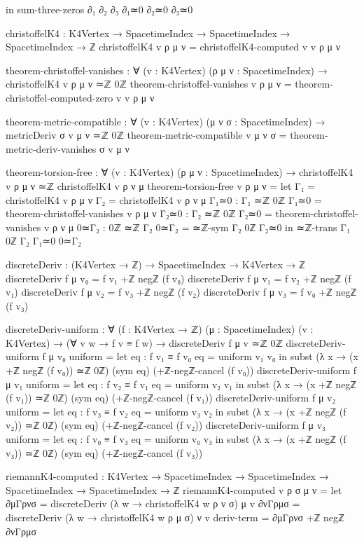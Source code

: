 \documentclass[11pt,a4paper]{book}
\begin{document}
\begin{code}
  in sum-three-zeros ∂₁ ∂₂ ∂₃ ∂₁≃0 ∂₂≃0 ∂₃≃0

christoffelK4 : K4Vertex → SpacetimeIndex → SpacetimeIndex → SpacetimeIndex → ℤ
christoffelK4 v ρ μ ν = christoffelK4-computed v v ρ μ ν

theorem-christoffel-vanishes : ∀ (v : K4Vertex) (ρ μ ν : SpacetimeIndex) →
                                christoffelK4 v ρ μ ν ≃ℤ 0ℤ
theorem-christoffel-vanishes v ρ μ ν = theorem-christoffel-computed-zero v v ρ μ ν

theorem-metric-compatible : ∀ (v : K4Vertex) (μ ν σ : SpacetimeIndex) →
  metricDeriv σ v μ ν ≃ℤ 0ℤ
theorem-metric-compatible v μ ν σ = theorem-metric-deriv-vanishes σ v μ ν

theorem-torsion-free : ∀ (v : K4Vertex) (ρ μ ν : SpacetimeIndex) →
  christoffelK4 v ρ μ ν ≃ℤ christoffelK4 v ρ ν μ
theorem-torsion-free v ρ μ ν = 
  let Γ₁ = christoffelK4 v ρ μ ν
      Γ₂ = christoffelK4 v ρ ν μ
      Γ₁≃0 : Γ₁ ≃ℤ 0ℤ
      Γ₁≃0 = theorem-christoffel-vanishes v ρ μ ν
      Γ₂≃0 : Γ₂ ≃ℤ 0ℤ
      Γ₂≃0 = theorem-christoffel-vanishes v ρ ν μ
      0≃Γ₂ : 0ℤ ≃ℤ Γ₂
      0≃Γ₂ = ≃ℤ-sym {Γ₂} {0ℤ} Γ₂≃0
  in ≃ℤ-trans {Γ₁} {0ℤ} {Γ₂} Γ₁≃0 0≃Γ₂

discreteDeriv : (K4Vertex → ℤ) → SpacetimeIndex → K4Vertex → ℤ
discreteDeriv f μ v₀ = f v₁ +ℤ negℤ (f v₀)
discreteDeriv f μ v₁ = f v₂ +ℤ negℤ (f v₁)
discreteDeriv f μ v₂ = f v₃ +ℤ negℤ (f v₂)
discreteDeriv f μ v₃ = f v₀ +ℤ negℤ (f v₃)

discreteDeriv-uniform : ∀ (f : K4Vertex → ℤ) (μ : SpacetimeIndex) (v : K4Vertex) →
                        (∀ v w → f v ≡ f w) → discreteDeriv f μ v ≃ℤ 0ℤ
discreteDeriv-uniform f μ v₀ uniform = 
  let eq : f v₁ ≡ f v₀
      eq = uniform v₁ v₀
  in subst (λ x → (x +ℤ negℤ (f v₀)) ≃ℤ 0ℤ) (sym eq) (+ℤ-negℤ-cancel (f v₀))
discreteDeriv-uniform f μ v₁ uniform = 
  let eq : f v₂ ≡ f v₁
      eq = uniform v₂ v₁
  in subst (λ x → (x +ℤ negℤ (f v₁)) ≃ℤ 0ℤ) (sym eq) (+ℤ-negℤ-cancel (f v₁))
discreteDeriv-uniform f μ v₂ uniform = 
  let eq : f v₃ ≡ f v₂
      eq = uniform v₃ v₂
  in subst (λ x → (x +ℤ negℤ (f v₂)) ≃ℤ 0ℤ) (sym eq) (+ℤ-negℤ-cancel (f v₂))
discreteDeriv-uniform f μ v₃ uniform = 
  let eq : f v₀ ≡ f v₃
      eq = uniform v₀ v₃
  in subst (λ x → (x +ℤ negℤ (f v₃)) ≃ℤ 0ℤ) (sym eq) (+ℤ-negℤ-cancel (f v₃))

riemannK4-computed : K4Vertex → SpacetimeIndex → SpacetimeIndex → 
                     SpacetimeIndex → SpacetimeIndex → ℤ
riemannK4-computed v ρ σ μ ν = 
  let
      ∂μΓρνσ = discreteDeriv (λ w → christoffelK4 w ρ ν σ) μ v
      ∂νΓρμσ = discreteDeriv (λ w → christoffelK4 w ρ μ σ) ν v
      deriv-term = ∂μΓρνσ +ℤ negℤ ∂νΓρμσ
      

\end{code}
\end{document}
